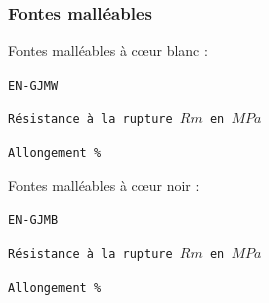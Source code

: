 \documentclass[11pt,oneside]{article}
\begin{document}
\subsubsection{Fontes malléables}

\begin{resultat}
Fontes malléables à c\oe{}ur blanc :

\begin{minipage}[c]{.3\linewidth}
\begin{center}
\texttt{EN-GJMW}
\end{center}
\end{minipage} \hfill
\begin{minipage}[c]{.3\linewidth}
\begin{center}
\texttt{Résistance à la rupture $Rm$ en $MPa$}
\end{center}
\end{minipage} \hfill
\begin{minipage}[c]{.3\linewidth}
\begin{center}
\texttt{Allongement \%}
\end{center}
\end{minipage} 

Fontes malléables à c\oe{}ur noir :

\begin{minipage}[c]{.3\linewidth}
\begin{center}
\texttt{EN-GJMB}
\end{center}
\end{minipage} \hfill
\begin{minipage}[c]{.3\linewidth}
\begin{center}
\texttt{Résistance à la rupture $Rm$ en $MPa$}
\end{center}
\end{minipage} \hfill
\begin{minipage}[c]{.3\linewidth}
\begin{center}
\texttt{Allongement \%}
\end{center}
\end{minipage} 


\end{resultat}
\end{document}
